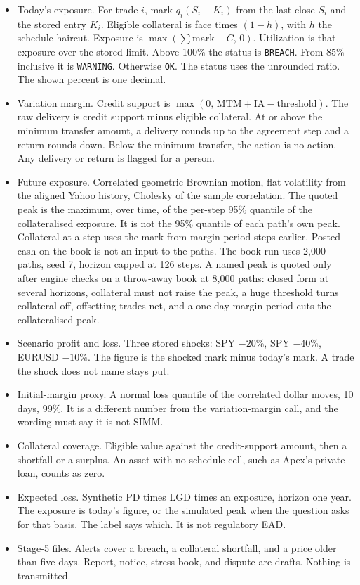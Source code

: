 \documentclass[11pt,a4paper]{article}
\begin{document}
\begin{itemize}
  \item Today's exposure. For trade $i$, mark $q_i(S_i-K_i)$ from the last close $S_i$ and the stored entry $K_i$. Eligible collateral is face times $(1-h)$, with $h$ the schedule haircut. Exposure is $\max(\sum \mathrm{mark} - C,\, 0)$. Utilization is that exposure over the stored limit. Above 100\% the status is \texttt{BREACH}. From 85\% inclusive it is \texttt{WARNING}. Otherwise \texttt{OK}. The status uses the unrounded ratio. The shown percent is one decimal.
  \item Variation margin. Credit support is $\max(0,\, \mathrm{MTM}+\mathrm{IA}-\mathrm{threshold})$. The raw delivery is credit support minus eligible collateral. At or above the minimum transfer amount, a delivery rounds up to the agreement step and a return rounds down. Below the minimum transfer, the action is no action. Any delivery or return is flagged for a person.
  \item Future exposure. Correlated geometric Brownian motion, flat volatility from the aligned Yahoo history, Cholesky of the sample correlation. The quoted peak is the maximum, over time, of the per-step 95\% quantile of the collateralised exposure. It is not the 95\% quantile of each path's own peak. Collateral at a step uses the mark from margin-period steps earlier. Posted cash on the book is not an input to the paths. The book run uses 2{,}000 paths, seed 7, horizon capped at 126 steps. A named peak is quoted only after engine checks on a throw-away book at 8{,}000 paths: closed form at several horizons, collateral must not raise the peak, a huge threshold turns collateral off, offsetting trades net, and a one-day margin period cuts the collateralised peak.
  \item Scenario profit and loss. Three stored shocks: SPY $-20\%$, SPY $-40\%$, EURUSD $-10\%$. The figure is the shocked mark minus today's mark. A trade the shock does not name stays put.
  \item Initial-margin proxy. A normal loss quantile of the correlated dollar moves, 10 days, 99\%. It is a different number from the variation-margin call, and the wording must say it is not SIMM.
  \item Collateral coverage. Eligible value against the credit-support amount, then a shortfall or a surplus. An asset with no schedule cell, such as Apex's private loan, counts as zero.
  \item Expected loss. Synthetic PD times LGD times an exposure, horizon one year. The exposure is today's figure, or the simulated peak when the question asks for that basis. The label says which. It is not regulatory EAD.
  \item Stage-5 files. Alerts cover a breach, a collateral shortfall, and a price older than five days. Report, notice, stress book, and dispute are drafts. Nothing is transmitted.
\end{itemize}
\end{document}
